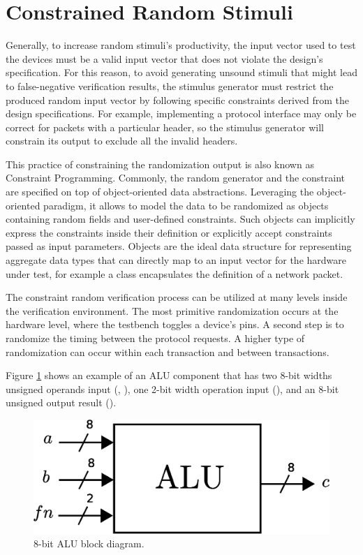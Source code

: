 \section{Constrained Random Stimuli}\label{sec:constrainedrandomsti}
Generally, to increase random stimuli's productivity, the input vector used to
test the devices must be a valid input vector that does not violate the design's
specification. For this reason, to avoid generating unsound stimuli that might
lead to false-negative verification results, the stimulus generator must
restrict the produced random input vector by following specific constraints
derived from the design specifications. For example, implementing a protocol
interface may only be correct for packets with a particular header, so the
stimulus generator will constrain its output to exclude all the invalid headers.

This practice of constraining the randomization output is also known as
Constraint Programming. Commonly, the random generator and the constraint are
specified on top of object-oriented data abstractions. Leveraging the
object-oriented paradigm, it allows to model the data to be randomized as
objects containing random fields and user-defined constraints. Such objects can
implicitly express the constraints inside their definition or explicitly accept
constraints passed as input parameters. Objects are the ideal data structure for
representing aggregate data types that can directly map to an input vector for
the hardware under test, for example a class encapsulates the definition of a
network packet.

The constraint random verification process can be utilized at many levels inside
the verification environment. The most primitive randomization occurs at the
hardware level, where the testbench toggles a device's pins. A second step is to
randomize the timing between the protocol requests. A higher type of
randomization can occur within each transaction and between transactions.

Figure \ref{fig:crv:alu} shows an example of an ALU component that has two 8-bit
widths unsigned operands input (, ), one 2-bit width operation
input (), and an 8-bit unsigned output result ().

\begin{figure}[htbp]
\centering
\includegraphics[width=0.4\linewidth]{pictures/ALU.eps}
\caption{8-bit ALU block diagram.}
\label{fig:crv:alu}
\end{figure}

